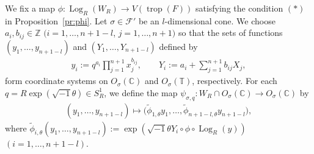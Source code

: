 \documentclass[pdftex]{sigma}
\numberwithin{equation}{section}
\begin{document}
We f\/ix a map $\phi \colon \operatorname{Log}_R(W_R) \to V(\operatorname{trop}(F))$ satisfying the condition $(\ast)$ in Proposition~\ref{pr:phi}. Let $\sigma \in {\mathcal F}'$ be an $l$-dimensional cone. We choose $a_i, b_{ij} \in {\mathbb Z}$ $(i=1, \dots, n+1-l$, $j=1, \dots, n+1)$ so that the sets of functions $(y_1, \dots ,y_{n+1-l})$ and $(Y_1, \dots, Y_{n+1-l})$ def\/ined by
\begin{gather}\label{eq:cood}
y_i:=q^{a_i}\prod_{j=1}^{n+1}x_j^{b_{ij}},\qquad Y_i:=a_i+\sum_{j=1}^{n+1}b_{ij}X_j,
\end{gather}
form coordinate systems on $O_\sigma({\mathbb C})$ and $O_\sigma({\mathbb T})$, respectively. For each $q = R \exp(\sqrt{-1}\theta) \in S_R^1$, we def\/ine the map $\psi_{\sigma,q} \colon W_R \cap O_\sigma({\mathbb C}) \to O_\sigma({\mathbb C})$ by
\begin{gather*}%
(y_1, \dots ,y_{n+1-l}) \mapsto \big(\tilde{\phi}_{1,\theta}y_1, \dots, \tilde{\phi}_{n+1-l,\theta}y_{n+1-l}\big),
\end{gather*}
where $\tilde{\phi}_{i,\theta}(y_1, \dots, y_{n+1-l}) := \exp \left(\sqrt{-1} \theta Y_i \circ \phi \circ \operatorname{Log}_R (y) \right)$ $(i=1, \dots, n+1-l)$.
\end{document}
